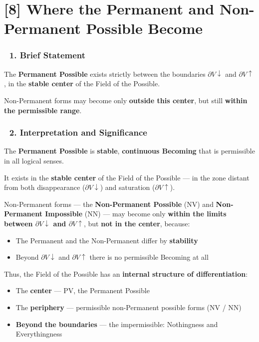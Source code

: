 \documentclass[12pt]{article}
\begin{document}
\section*{[8] Where the Permanent and Non-Permanent Possible Become}

\subsubsection*{🔹 1. Brief Statement}
The \textbf{Permanent Possible} exists strictly between the boundaries $\partial V↓$ and $\partial V↑$, in the \textbf{stable center} of the Field of the Possible.

Non-Permanent forms may become only \textbf{outside this center}, but still \textbf{within the permissible range}.

\subsubsection*{🔹 2. Interpretation and Significance}
The \textbf{Permanent Possible} is \textbf{stable}, \textbf{continuous Becoming} that is permissible in all logical senses.

It exists in the \textbf{stable center} of the Field of the Possible — in the zone distant from both disappearance ($\partial V↓$) and saturation ($\partial V↑$).

\bigskip
Non-Permanent forms — the \textbf{Non-Permanent Possible} (NV) and \textbf{Non-Permanent Impossible} (NN) — may become only \textbf{within the limits between $\partial V↓$ and $\partial V↑$}, but \textbf{not in the center}, because:
\begin{itemize}
\item The Permanent and the Non-Permanent differ by \textbf{stability}
\item Beyond $\partial V↓$ and $\partial V↑$ there is no permissible Becoming at all
\end{itemize}

\bigskip
Thus, the Field of the Possible has an \textbf{internal structure of differentiation}:
\begin{itemize}
\item The \textbf{center} — PV, the Permanent Possible
\item The \textbf{periphery} — permissible non-Permanent possible forms (NV / NN)
\item \textbf{Beyond the boundaries} — the impermissible: Nothingness and Everythingness
\end{itemize}
\end{document}
